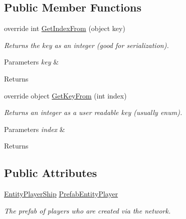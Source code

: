 \subsection*{Public Member Functions}
\begin{DoxyCompactItemize}
\item 
\hypertarget{class_skyrates_1_1_common_1_1_entity_1_1_entity_list_aa2ef8d8d41cc0bb4a105d614614c065a}{override int \hyperlink{class_skyrates_1_1_common_1_1_entity_1_1_entity_list_aa2ef8d8d41cc0bb4a105d614614c065a}{Get\-Index\-From} (object key)}\label{class_skyrates_1_1_common_1_1_entity_1_1_entity_list_aa2ef8d8d41cc0bb4a105d614614c065a}

\begin{DoxyCompactList}\small\item\em Returns the key as an integer (good for serialization). 


\begin{DoxyParams}{Parameters}
{\em key} & \\
\hline
\end{DoxyParams}
\begin{DoxyReturn}{Returns}

\end{DoxyReturn}
 \end{DoxyCompactList}\item 
\hypertarget{class_skyrates_1_1_common_1_1_entity_1_1_entity_list_a530e1a58f7f0eaddd8a5940b614b91b1}{override object \hyperlink{class_skyrates_1_1_common_1_1_entity_1_1_entity_list_a530e1a58f7f0eaddd8a5940b614b91b1}{Get\-Key\-From} (int index)}\label{class_skyrates_1_1_common_1_1_entity_1_1_entity_list_a530e1a58f7f0eaddd8a5940b614b91b1}

\begin{DoxyCompactList}\small\item\em Returns an integer as a user readable key (usually enum). 


\begin{DoxyParams}{Parameters}
{\em index} & \\
\hline
\end{DoxyParams}
\begin{DoxyReturn}{Returns}

\end{DoxyReturn}
 \end{DoxyCompactList}\end{DoxyCompactItemize}
\subsection*{Public Attributes}
\begin{DoxyCompactItemize}
\item 
\hyperlink{class_skyrates_1_1_client_1_1_entity_1_1_entity_player_ship}{Entity\-Player\-Ship} \hyperlink{class_skyrates_1_1_common_1_1_entity_1_1_entity_list_ac000d4ac8899bd2b5cf36f22fd7e52ce}{Prefab\-Entity\-Player}
\begin{DoxyCompactList}\small\item\em The prefab of players who are created via the network. \end{DoxyCompactList}\end{DoxyCompactItemize}
